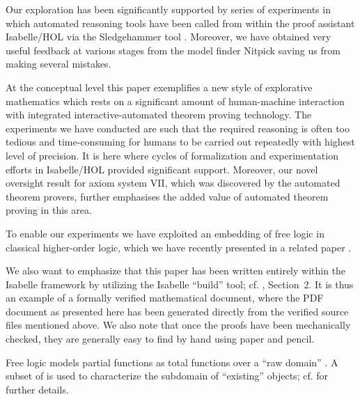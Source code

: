 \begin{isabellebody}
\begin{isamarkuptext}
Our exploration has been significantly supported by series of experiments in which automated reasoning tools 
have been called from within the proof assistant Isabelle/HOL \cite{Isabelle} via the Sledgehammer 
tool \cite{Sledgehammer}. Moreover, we have obtained very useful feedback at various stages 
from the model finder Nitpick \cite{Nitpick} saving us from making several mistakes.

At the conceptual level this paper exemplifies a new style of explorative mathematics which rests 
on a significant amount of human-machine interaction with integrated interactive-auto\-ma\-ted 
theorem proving technology. The experiments we have conducted are such that the required 
reasoning is often too tedious and time-consuming for humans to be carried out repeatedly with 
highest level of precision. It is here where cycles of formalization and experimentation efforts in 
Isabelle/HOL provided  significant support. Moreover, our novel oversight result for axiom 
system VII, which was discovered by the automated theorem provers, further emphasises the added 
value of automated theorem proving in this area. 

To enable our experiments we have exploited an embedding of free logic \cite{Scott67} 
in classical higher-order logic, which we have recently presented in a related paper \cite{C57}.


We also want to emphasize that this paper has been written entirely within the Isabelle 
framework by utilizing the Isabelle ``build'' tool; cf. \cite{IsabelleManual2016}, Section~2. 
It is thus an example of a formally verified mathematical document, where the PDF document as 
presented here has been generated directly from the verified source files mentioned above.
We also note that once the proofs have been mechanically checked, they are generally easy 
to find by hand using paper and pencil.%
\end{isamarkuptext}\isamarkuptrue%
%
\isamarkuptrue%
%
\begin{isamarkuptext}%
Free logic models partial functions as total functions over a ``raw domain'' . 
A subset  of  is used to characterize the subdomain of ``existing'' objects; cf.
\cite{Scott67} for further details.


\end{isamarkuptext}
\end{isabellebody}
